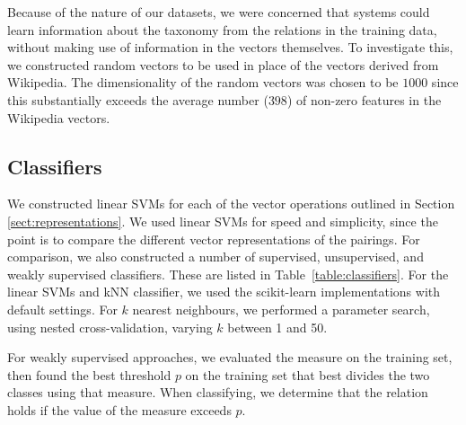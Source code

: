 \documentclass[11pt]{article}
\begin{document}



Because of the nature of our datasets, we were concerned that systems
could learn information about the taxonomy from the relations in the
training data, without making use of information in the vectors
themselves. To investigate this, we constructed random vectors to be
used in place of the vectors derived from Wikipedia. The
dimensionality of the random vectors was chosen to be $1000$ since
this substantially exceeds the average number ($398$) of non-zero
features in the Wikipedia vectors.

\subsection{Classifiers}

We constructed linear SVMs for each of the vector operations outlined
in Section \ref{sect:representations}.  We used linear SVMs for speed
and simplicity, since the point is to compare the different vector
representations of the pairings. For comparison, we also constructed a
number of supervised, unsupervised, and weakly supervised
classifiers. These are listed in Table~\ref{table:classifiers}. For the linear SVMs and kNN classifier, we
used the scikit-learn implementations with default
settings. For $k$ nearest neighbours, we performed a parameter search,
using nested cross-validation, varying $k$ between 1 and 50.

For weakly supervised approaches, we evaluated the measure on the
training set, then found the best threshold $p$ on the training set
that best divides the two classes using that measure. When
classifying, we determine that the relation holds if the value of the
measure exceeds $p$.
\end{document}
